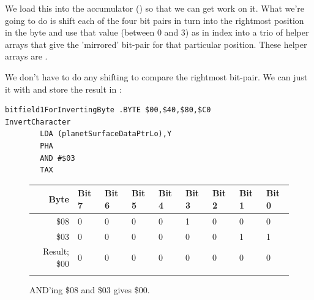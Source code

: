 \begin{figure}[H]
  {
    \setlength{\tabcolsep}{3.0pt}
    \setlength\cmidrulewidth{\lightrulewidth} %
    \begin{adjustbox}{width=4cm,center}
    \end{adjustbox}
  }
\end{figure}

We load this into the accumulator () so that we can get work on it. What we're going to
do is shift each of the four bit pairs in turn into the rightmost position in the byte and use
that value (between 0 and 3) as in index into a trio of helper arrays that give the 'mirrored'
bit-pair for that particular position. These helper arrays are .

We don't have to do any shifting to compare the rightmost bit-pair. We can just  it with
 and store the result in :

\begin{lstlisting}
bitfield1ForInvertingByte .BYTE $00,$40,$80,$C0
InvertCharacter
        LDA (planetSurfaceDataPtrLo),Y
        PHA
        AND #$03
        TAX
\end{lstlisting}


\begin{figure}[H]
  {
    \setlength{\tabcolsep}{3.0pt}
    \setlength\cmidrulewidth{\heavyrulewidth} %
    \begin{adjustbox}{width=10cm,center}

      \begin{tabular}{rllllllll}
        \toprule
        Byte & Bit 7 & Bit 6 & Bit 5 & Bit 4 & Bit 3 & Bit 2 & Bit 1 & Bit 0        \\
        \midrule
        \$08 & 0 & 0 & 0 & 0 & 1 & 0 & 0 & 0 \\
        \$03 & 0 & 0 & 0 & 0 & 0 & 0 & 1 & 1 \\
        \midrule
        Result; \$00 & 0 & 0 & 0 & 0 & 0 & 0 & 0 & 0 \\
        \addlinespace
        \bottomrule
      \end{tabular}

    \end{adjustbox}

  }\caption*{AND'ing \$08 and \$03 gives \$00.}
\end{figure}


